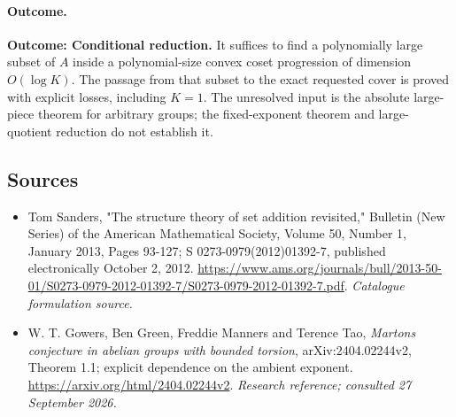 \documentclass[11pt,a4paper]{article}
\numberwithin{equation}{section}
\begin{document}
\paragraph{Outcome.}
\textbf{Outcome: Conditional reduction.}
It suffices to find a polynomially large subset of $A$ inside a polynomial-size convex coset progression of dimension $O(\log K)$. The passage from that subset to the exact requested cover is proved with explicit losses, including $K=1$. The unresolved input is the absolute large-piece theorem for arbitrary groups; the fixed-exponent theorem and large-quotient reduction do not establish it.

\subsection{Sources}
\begin{itemize}\raggedright
\item[\textnormal{[S1]}]\hypertarget{source:statement:1}{} Tom Sanders, "The structure theory of set addition revisited," Bulletin (New Series) of the American Mathematical Society, Volume 50, Number 1, January 2013, Pages 93-127; S 0273-0979(2012)01392-7, published electronically October 2, 2012.
\url{https://www.ams.org/journals/bull/2013-50-01/S0273-0979-2012-01392-7/S0273-0979-2012-01392-7.pdf}.
{\small\textit{Catalogue formulation source.}}
\item[\textnormal{[E1]}]\hypertarget{extra:statement:1}{} W. T. Gowers, Ben Green, Freddie Manners and Terence Tao, \emph{Marton\textquotesingle s conjecture in abelian groups with bounded torsion}, arXiv:2404.02244v2, Theorem 1.1; explicit dependence on the ambient exponent.
\url{https://arxiv.org/html/2404.02244v2}.
{\small\textit{Research reference; consulted 27 September 2026.}}
\end{itemize}
\end{document}

